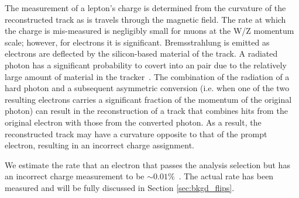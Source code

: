 The measurement of a lepton's charge is determined from the curvature of the
reconstructed track as is travels through the magnetic field. The rate at which
the charge is mis-measured is negligibly small for muons at the W/Z momentum
scale; however, for electrons it is significant. Bremsstrahlung is emitted as
electrons are deflected by the silicon-based material of the track. A radiated
photon has a significant probability to covert into an \epem pair due to the
relatively large amount of material in the tracker~\cite{tdr1}. The combination
of the radiation of a hard photon and a subsequent asymmetric conversion (i.e.
when one of the two resulting electrons carries a significant fraction of the
momentum of the original photon) can result in the reconstruction of a track
that combines hits from the original electron with those from the converted
photon. As a result, the reconstructed track may have a curvature opposite to
that of the prompt electron, resulting in an incorrect charge assignment.

We estimate the rate that an electron that passes the analysis selection but
has an incorrect charge measurement to be $\sim 0.01\%$~\cite{an_ssb2013}.
The actual rate has been measured and will be fully discussed in Section
\ref{sec:bkgd_flips}.
